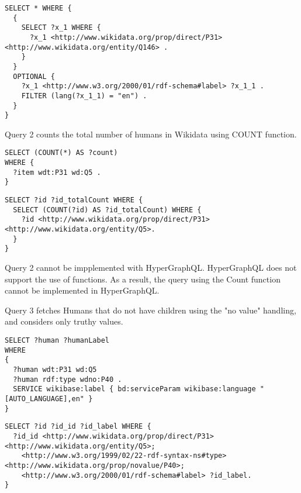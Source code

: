 \begin{minipage}{\linewidth}
\begin{lstlisting}[label=listing:listing36, caption={Query 1 - HypergraphQL}]
SELECT * WHERE {
  {
    SELECT ?x_1 WHERE {
      ?x_1 <http://www.wikidata.org/prop/direct/P31> <http://www.wikidata.org/entity/Q146> .
    }
  }
  OPTIONAL {
    ?x_1 <http://www.w3.org/2000/01/rdf-schema#label> ?x_1_1 .
    FILTER (lang(?x_1_1) = "en") .
  }
}
\end{lstlisting}
\end{minipage}


Query 2 counts the total number of humans in Wikidata using COUNT function.

\begin{minipage}{\linewidth}
\begin{lstlisting}[label=listing:listing37, caption={Query 2}]
SELECT (COUNT(*) AS ?count)
WHERE {
  ?item wdt:P31 wd:Q5 .
}
\end{lstlisting}
\end{minipage}


\begin{minipage}{\linewidth}
\begin{lstlisting}[label=listing:listing38, caption={Query 2 - GraphQL-LD}]
SELECT ?id ?id_totalCount WHERE {
  SELECT (COUNT(?id) AS ?id_totalCount) WHERE {
    ?id <http://www.wikidata.org/prop/direct/P31> <http://www.wikidata.org/entity/Q5>.
  }
}
\end{lstlisting}
\end{minipage}

Query 2 cannot be impplemented with HyperGraphQL. HyperGraphQL does not support the use of functions. As a result, the query using the Count function cannot be implemented in HyperGraphQL.


Query 3 fetches Humans that do not have children using the "no value" handling, and considers only truthy values. 

\begin{minipage}{\linewidth}
\begin{lstlisting}[label=listing:listing39, caption={Query 3}]
SELECT ?human ?humanLabel
WHERE
{
  ?human wdt:P31 wd:Q5 
  ?human rdf:type wdno:P40 .  
  SERVICE wikibase:label { bd:serviceParam wikibase:language "[AUTO_LANGUAGE],en" }
}
\end{lstlisting}
\end{minipage}

\begin{minipage}{\linewidth}
\begin{lstlisting}[label=listing:listing40, caption={Query 3 - GraphQL-LD}]
SELECT ?id ?id_id ?id_label WHERE {
  ?id_id <http://www.wikidata.org/prop/direct/P31> <http://www.wikidata.org/entity/Q5>;
    <http://www.w3.org/1999/02/22-rdf-syntax-ns#type> <http://www.wikidata.org/prop/novalue/P40>;
    <http://www.w3.org/2000/01/rdf-schema#label> ?id_label.
}
\end{lstlisting}
\end{minipage}

